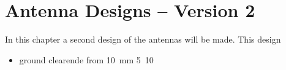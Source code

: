 \chapter{Antenna Designs -- Version 2}
In this chapter a second design of the antennas will be made. This design 


\begin{itemize}
\item ground clearende from \SI{10}{mm} \SI{5}{10}
\end{itemize}
